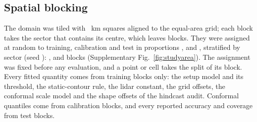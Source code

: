 
\subsection*{Spatial blocking}
The domain was tiled with ~km squares aligned to the equal-area grid; each block takes the sector that contains its centre, which leaves  blocks. They were assigned at random to training, calibration and test in proportions ,  and , stratified by sector (seed ): ,  and  blocks (Supplementary Fig.~\ref{fig:studyarea}). The assignment was fixed before any evaluation, and a point or cell takes the split of its block. Every fitted quantity comes from training blocks only: the setup model and its threshold, the static-contour rule, the lidar constant, the grid offsets, the conformal scale model and the shape offsets of the hindcast audit. Conformal quantiles come from calibration blocks, and every reported accuracy and coverage from test blocks.

